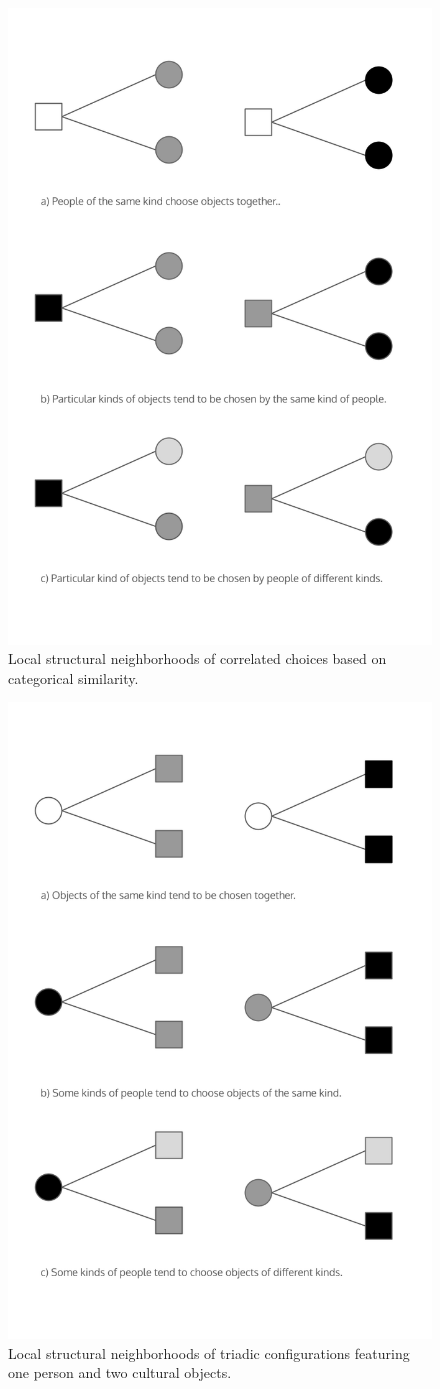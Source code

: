\documentclass[preprint,12pt,authoryear]{elsarticle}
\begin{document}
\newpage

\begin{figure}
    \centering
    \includegraphics[width=0.8\linewidth]{Figs/local-struct2.png}
    \caption{Local structural neighborhoods of correlated choices based on categorical similarity.}
    \label{fig:local-struct2}
\end{figure}

\newpage

\begin{figure}
    \centering
    \includegraphics[width=0.8\linewidth]{Figs/local-struct3.png}
    \caption{Local structural neighborhoods of triadic configurations featuring one person and two cultural objects.}
    \label{fig:local-struct3}
\end{figure}
\end{document}
